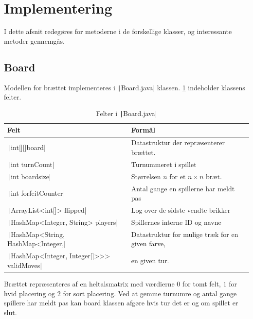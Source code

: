 \section{Implementering}
I dette afsnit redegøres for metoderne i de forskellige klasser, og interessante metoder gennemgås.
\subsection{Board}\label{sec:boardImplement}
Modellen for brættet implementeres i \texttt|Board.java| klassen. \cref{tbl:boardfields} indeholder klassens felter.
\begin{table}[H]
    \centering
    \caption{Felter i \texttt|Board.java|}\label{tbl:boardfields}
    \begin{tabular}{ll}
        \toprule
        Felt                                                              & Formål                                           \\
        \midrule
        \texttt|int[][]board|                                   & Datastruktur der repræsenterer brættet.          \\
        \texttt|int turnCount|                                  & Turnummeret i spillet                            \\
        \texttt|int boardsize|                                  & Størrelsen \(n\) for et \(n\times n\) bræt.      \\
        \texttt|int forfeitCounter|                             & Antal gange en spillerne har meldt pas           \\
        \texttt|ArrayList<int[]> flipped|                       & Log over de sidste vendte brikker                \\
        \texttt|HashMap<Integer, String> players|               & Spillernes interne ID og navne                   \\
        \texttt|HashMap<String, HashMap<Integer,|               & Datastruktur for mulige træk for en given farve, \\
        \quad \texttt|HashMap<Integer, Integer[]>>> validMoves| & en given tur.                                    \\
        \bottomrule
    \end{tabular}
\end{table}
Brættet repræsenteres af en heltalsmatrix med værdierne \(0\) for tomt felt, \(1\) for hvid placering og \(2\) for sort placering. Ved at gemme turnumre og antal gange spillere har meldt pas kan board klassen afgøre hvis tur det er og om spillet er slut.
